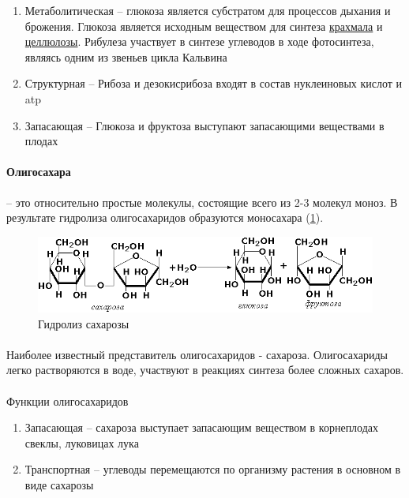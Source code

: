 \begin{enumerate}
	\item Метаболитическая -- глюкоза является субстратом для процессов дыхания и брожения. Глюкоза является исходным веществом для синтеза \hyperlink{krahmal}{крахмала} и \hyperlink{cellulosa}{целлюлозы}. Рибулеза участвует в синтезе углеводов в ходе фотосинтеза, являясь одним из звеньев цикла Кальвина
	\item Структурная -- Рибоза и дезокисрибоза входят в состав нуклеиновых кислот и \gls{atp}
	\item Запасающая -- Глюкоза и фруктоза выступают запасающими веществами в плодах
\end{enumerate}

\paragraph*{Олигосахара} -- это относительно простые молекулы, состоящие всего из 2-3 молекул моноз. В результате гидролиза олигосахаридов образуются моносахара (\ris \ref{hydrolis}).

\begin{figure}[h!]
  \centering
       \includegraphics[width=0.5\linewidth]{pictures/hydrolis}
\caption{Гидролиз сахарозы}
\label{hydrolis}
\end{figure}

\paragraph*{}Наиболее известный представитель олигосахаридов - сахароза. Олигосахариды легко растворяются в воде, участвуют в реакциях синтеза более сложных сахаров.

\paragraph*{}Функции олигосахаридов 

\begin{enumerate}
	\item Запасающая -- сахароза выступает запасающим веществом в корнеплодах свеклы, луковицах лука \cite{zauralov_1995}
	\item Транспортная -- углеводы перемещаются по организму растения в основном в виде сахарозы
\end{enumerate}

